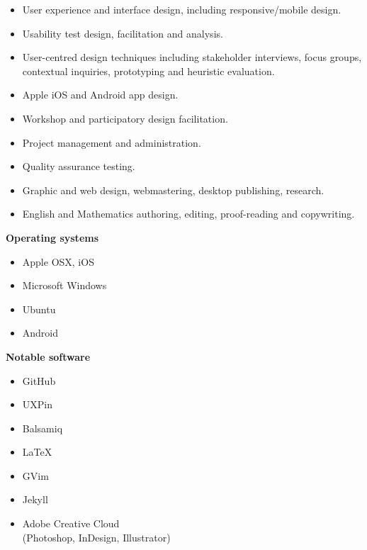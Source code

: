 \documentclass[]{friggeri-cv} %
\begin{document}
\begin{itemize}
\item User experience and interface design, including responsive/mobile design.
\item Usability test design, facilitation and analysis.
\item User-centred design techniques including stakeholder interviews, focus groups, contextual inquiries, prototyping and heuristic evaluation.
\item Apple iOS and Android app design. 
\item Workshop and participatory design facilitation.
\item Project management and administration.
\item Quality assurance testing.
\item Graphic and web design, webmastering, desktop publishing, research.
\item English and Mathematics authoring, editing, proof-reading and copywriting.\\

\end{itemize}



\textbf{Operating systems}
\begin{multicols}{2}
\begin{itemize}
 \item Apple OSX, iOS
 \item Microsoft Windows
 \item Ubuntu
 \item Android
\end{itemize}
\end{multicols}

\textbf{Notable software}
\begin{multicols}{2}
\begin{itemize}
 \item GitHub
 \item UXPin
\item Balsamiq
 \item LaTeX
 \item GVim
 \item Jekyll
   \item Adobe Creative Cloud \\ (Photoshop, InDesign, Illustrator)
\end{itemize}
\end{multicols}
\end{document}
